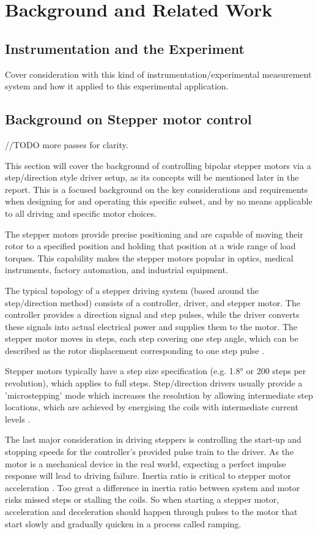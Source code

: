 \chapter{Background and Related Work}\label{C:back}


\section{Instrumentation and the Experiment}
Cover consideration with this kind of instrumentation/experimental measurement system and how it applied to this experimental application.

\section{Background on Stepper motor control}
//TODO more passes for clarity.

This section will cover the background of controlling bipolar stepper motors via a step/direction style driver setup, as its concepts will be mentioned later in the report. This is a focused background on the key considerations and requirements when designing for and operating this specific subset, and by no means applicable to all driving and specific motor choices.

The stepper motors provide precise positioning and are capable of moving their rotor to a specified position and holding that position at a wide range of load torques. This capability makes the stepper motors popular in optics, medical instruments, factory automation, and industrial equipment.

The typical topology of a stepper driving system (based around the step/direction method) consists of a controller, driver, and stepper motor. The controller provides a direction signal and step pulses, while the driver converts these signals into actual electrical power and supplies them to the motor. The stepper motor moves in steps, each step covering one step angle, which can be described as the rotor displacement corresponding to one step pulse \cite{step_app}.

Stepper motors typically have a step size specification (e.g. 1.8° or 200 steps per revolution), which applies to full steps. Step/direction drivers usually provide a 'microstepping' mode which increases the resolution by allowing intermediate step locations, which are achieved by energising the coils with intermediate current levels \cite{step_book}.

The last major consideration in driving steppers is controlling the start-up and stopping speeds for the controller's provided pulse train to the driver. As the motor is a mechanical device in the real world, expecting a perfect impulse response will lead to driving failure. Inertia ratio is critical to stepper motor acceleration \cite{step_book}. Too great a difference in inertia ratio between system and motor risks missed steps or stalling the coils. So when starting a stepper motor, acceleration and deceleration should happen through pulses to the motor that start slowly and gradually quicken in a process called ramping.

